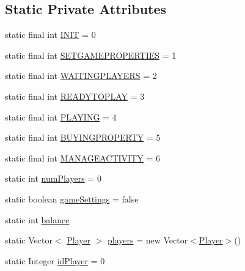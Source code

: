 \subsection*{Static Private Attributes}
\begin{DoxyCompactItemize}
\item 
static final int \hyperlink{class_monopoly_1_1_server_1_1_game_protocol_a3a3f1fded8c4f1f318e17e12ab184611}{I\+N\+IT} = 0
\item 
static final int \hyperlink{class_monopoly_1_1_server_1_1_game_protocol_a08a159e70f29fbac3d5c34c3bb06a0f7}{S\+E\+T\+G\+A\+M\+E\+P\+R\+O\+P\+E\+R\+T\+I\+ES} = 1
\item 
static final int \hyperlink{class_monopoly_1_1_server_1_1_game_protocol_aaefb144ef04b6626e85327e05d61e3b5}{W\+A\+I\+T\+I\+N\+G\+P\+L\+A\+Y\+E\+RS} = 2
\item 
static final int \hyperlink{class_monopoly_1_1_server_1_1_game_protocol_a371d01ccb2c3660c6122d7703447f6c6}{R\+E\+A\+D\+Y\+T\+O\+P\+L\+AY} = 3
\item 
static final int \hyperlink{class_monopoly_1_1_server_1_1_game_protocol_a5078e6a0fa8bddf15f6e995e5d2b40a3}{P\+L\+A\+Y\+I\+NG} = 4
\item 
static final int \hyperlink{class_monopoly_1_1_server_1_1_game_protocol_ac5ba79972e1e2d496ed779fdd7ed36f3}{B\+U\+Y\+I\+N\+G\+P\+R\+O\+P\+E\+R\+TY} = 5
\item 
static final int \hyperlink{class_monopoly_1_1_server_1_1_game_protocol_aff46964565cfd870509e3e39dc8c86d1}{M\+A\+N\+A\+G\+E\+A\+C\+T\+I\+V\+I\+TY} = 6
\item 
static int \hyperlink{class_monopoly_1_1_server_1_1_game_protocol_aa9b4699a2e82882951136ffb1e01c64e}{num\+Players} = 0
\item 
static boolean \hyperlink{class_monopoly_1_1_server_1_1_game_protocol_ad9946dfb84c7321318dee58de3c5f65c}{game\+Settings} = false
\item 
static int \hyperlink{class_monopoly_1_1_server_1_1_game_protocol_ad4eb56f1494064341fbf3556f17bd67a}{balance}
\item 
static Vector$<$ \hyperlink{class_monopoly_1_1_logic_1_1_player}{Player} $>$ \hyperlink{class_monopoly_1_1_server_1_1_game_protocol_ab7cff2b620c79623d1787e36ec5850f0}{players} = new Vector$<$\hyperlink{class_monopoly_1_1_logic_1_1_player}{Player}$>$()
\item 
static Integer \hyperlink{class_monopoly_1_1_server_1_1_game_protocol_a3ed87b0a6d4b81cd98ac415312a6fb75}{id\+Player} = 0
\item 

\end{DoxyCompactItemize}
